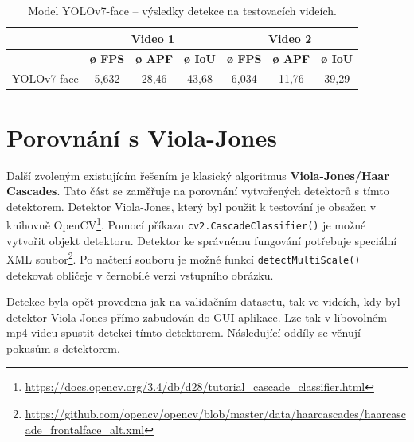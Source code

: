 \begin{table}[H]
  \centering
  \begin{tabular}{c|ccc|ccc|}
  \cline{2-7}
                                                               & \multicolumn{3}{c|}{\cellcolor[HTML]{CBCEFB}\textbf{Video 1}}                                                                              & \multicolumn{3}{c|}{\cellcolor[HTML]{CBCEFB}\textbf{Video 2}}                                                                              \\ \hline
  \rowcolor[HTML]{E0DBDB} 
  \multicolumn{1}{|c|}{\cellcolor[HTML]{E0DBDB}\textbf{Model}} & \multicolumn{1}{c|}{\cellcolor[HTML]{E0DBDB}\textbf{ø FPS}} & \multicolumn{1}{c|}{\cellcolor[HTML]{E0DBDB}\textbf{ø APF}} & \textbf{ø IoU} & \multicolumn{1}{c|}{\cellcolor[HTML]{E0DBDB}\textbf{ø FPS}} & \multicolumn{1}{c|}{\cellcolor[HTML]{E0DBDB}\textbf{ø APF}} & \textbf{ø IoU} \\ \hline
  \multicolumn{1}{|c|}{\cellcolor[HTML]{E0DBDB}YOLOv7-face}    & \multicolumn{1}{c|}{5,632}                                  & \multicolumn{1}{c|}{28,46}                                  & 43,68          & \multicolumn{1}{c|}{6,034}                                  & \multicolumn{1}{c|}{11,76}                                  & 39,29          \\ \hline
  \end{tabular}
  \label{tabulka:yolov7facevidea}
  \caption{Model YOLOv7-face -- výsledky detekce na testovacích videích.}
\end{table}

\section{Porovnání s Viola-Jones}
\label{sekce:vj}
Další zvoleným existujícím řešením je klasický algoritmus \textbf{Viola-Jones/Haar Cascades}. Tato část se zaměřuje na porovnání vytvořených detektorů s tímto detektorem. Detektor Viola-Jones, který byl použit k testování je obsažen v knihovně OpenCV\footnote{\url{https://docs.opencv.org/3.4/db/d28/tutorial_cascade_classifier.html}}. Pomocí příkazu \texttt{cv2.CascadeClassifier()} je možné vytvořit objekt detektoru. Detektor ke správnému fungování potřebuje speciální XML soubor\footnote{\url{https://github.com/opencv/opencv/blob/master/data/haarcascades/haarcascade_frontalface_alt.xml}}. Po načtení souboru je možné funkcí \texttt{detectMultiScale()} detekovat obličeje v černobílé verzi vstupního obrázku.

Detekce byla opět provedena jak na validačním datasetu, tak ve videích, kdy byl detektor Viola-Jones přímo zabudován do GUI aplikace. Lze tak v libovolném mp4 videu spustit detekci tímto detektorem. Následující oddíly se věnují pokusům s detektorem.

